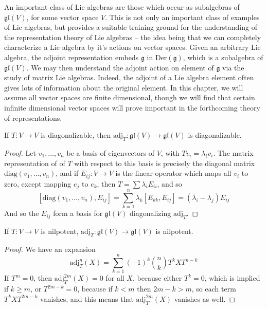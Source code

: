 An important class of Lie algebras are those which occur as subalgebras of $\mathfrak{gl}(V)$, for some vector space $V$. This is not only an important class of examples of Lie algebras, but provides a suitable training ground for the understanding of the representation theory of Lie algebras -- the idea being that we can completely characterize a Lie algebra by it's actions on vector spaces. Given an arbitrary Lie algebra, the adjoint representation embeds $\mathfrak{g}$ in $\text{Der}(\mathfrak{g})$, which is a subalgebra of $\mathfrak{gl}(V)$. We may then understand the adjoint action on element of $\mathfrak{g}$ via the study of matrix Lie algebras. Indeed, the adjoint of a Lie algebra element often gives lots of information about the original element. In this chapter, we will assume all vector spaces are finite dimensional, though we will find that certain infinite dimensional vector spaces will prove important in the forthcoming theory of representations.

\begin{theorem}
    If $T: V \to V$ is diagonalizable, then $\text{adj}_T: \mathfrak{gl}(V) \to \mathfrak{gl}(V)$ is diagonalizable.
\end{theorem}
\begin{proof}
    Let $v_1, \dots, v_n$ be a basis of eigenvectors of $V$, with $Tv_i = \lambda_i v_i$. The matrix representation of of $T$ with respect to this basis is precisely the diagonal matrix $\text{diag}(v_1, \dots, v_n)$, and if $E_{ij}: V \to V$ is the linear operator which maps all $v_i$ to zero, except mapping $e_j$ to $e_k$, then $T = \sum \lambda_i E_{ii}$, and so
    \[ [\text{diag}(v_1, \dots, v_n), E_{ij}] = \sum_{k = 1}^n \lambda_k [ E_{kk}, E_{ij} ] = (\lambda_i - \lambda_j) E_{ij} \]
    And so the $E_{ij}$ form a basis for $\mathfrak{gl}(V)$ diagonalizing $\text{adj}_T$.
\end{proof}

\begin{theorem}
    If $T: V \to V$ is nilpotent, $\text{adj}_T: \mathfrak{gl}(V) \to \mathfrak{gl}(V)$ is nilpotent.
\end{theorem}
\begin{proof}
    We have an expansion
    \[ \text{adj}_T^n(X) = \sum_{k = 1}^n (-1)^k {n \choose k} T^kXT^{n-k} \]
    If $T^m = 0$, then $\text{adj}_T^{2m}(X) = 0$ for all $X$, because either $T^k = 0$, which is implied if $k \geq m$, or $T^{2m - k} = 0$, because if $k < m$ then $2m - k > m$, so each term $T^kXT^{2m-k}$ vanishes, and this means that $\text{adj}_T^{2m}(X)$ vanishes as well.
\end{proof}

